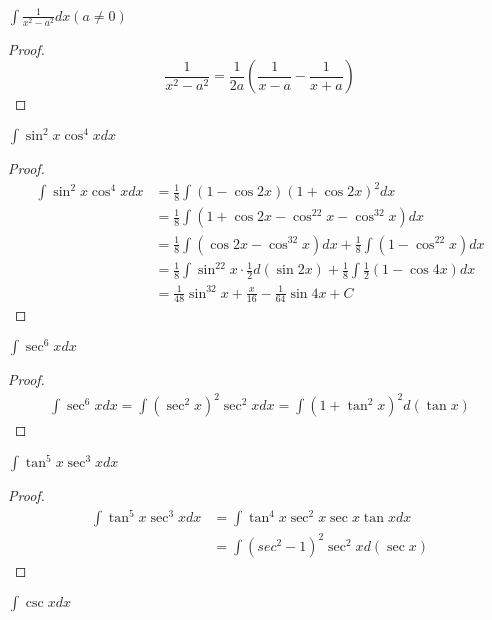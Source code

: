 \documentclass[11pt]{article}
\begin{document}
\begin{proposition}[]
\(\int\frac{1}{x^2-a^2}dx(a\neq0)\)
\end{proposition}

\begin{proof}
\begin{equation*}
\frac{1}{x^2-a^2}=\frac{1}{2a}(\frac{1}{x-a}-\frac{1}{x+a})
\end{equation*}
\end{proof}

\begin{proposition}[]
\(\int\sin^2x\cos^4xdx\)
\end{proposition}

\begin{proof}
\begin{align*}
\int\sin^2x\cos^4xdx&=\frac{1}{8}\int(1-\cos2x)(1+\cos2x)^2dx\\
&=\frac{1}{8}\int(1+\cos2x-\cos^22x-\cos^32x)dx\\
&=\frac{1}{8}\int(\cos2x-\cos^32x)dx+\frac{1}{8}\int(1-\cos^22x)dx\\
&=\frac{1}{8}\int\sin^22x\cdot\frac{1}{2}d(\sin2x)+\frac{1}{8}\int\frac{1}{2}(1-\cos4x)dx\\
&=\frac{1}{48}\sin^32x+\frac{x}{16}-\frac{1}{64}\sin4x+C
\end{align*}
\end{proof}

\begin{proposition}[]
\(\int\sec^6xdx\)
\end{proposition}

\begin{proof}
\begin{align*}
\int\sec^6xdx=\int(\sec^2x)^2\sec^2xdx=\int(1+\tan^2x)^2d(\tan x)
\end{align*}
\end{proof}

\begin{proposition}[]
\(\int\tan^5x\sec^3xdx\)
\end{proposition}

\begin{proof}
\begin{align*}
\int\tan^5x\sec^3xdx&=\int\tan^4x\sec^2x\sec x\tan xdx\\
&=\int(sec^2-1)^2\sec^2xd(\sec x)
\end{align*}
\end{proof}

\begin{proposition}[]
\(\int\csc xdx\)
\end{proposition}
\end{document}
